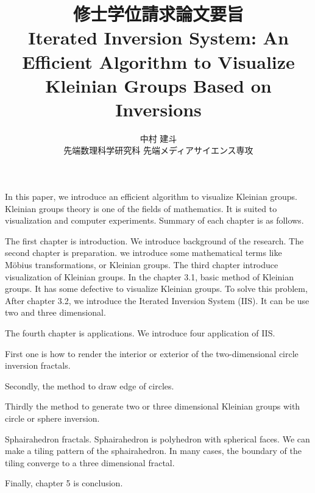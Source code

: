 \documentclass[uplatex, dvipdfmx]{article}
\title{修士学位請求論文要旨\\
 Iterated Inversion System: An Efficient Algorithm to Visualize Kleinian Groups Based on Inversions }
\author{中村 建斗\\
先端数理科学研究科 先端メディアサイエンス専攻\\
}
\date{}
\begin{document}
\maketitle
\pagestyle{plain}
\newpage

In this paper, we introduce an efficient algorithm to visualize Kleinian
groups.
Kleinian groups theory is one of the fields of mathematics.
It is suited to visualization and computer experiments.
Summary of each chapter is as follows.

The first chapter is introduction. 
We introduce background of the research.
The second chapter is preparation.
we introduce some mathematical terms like M\"obius
transformations, or Kleinian groups.
The third chapter introduce visualization of Kleinian groups.
In the chapter 3.1, basic method of Kleinian groups.
It has some defective to visualize Kleinian groups.
To solve this problem,
After chapter 3.2, we introduce the Iterated Inversion System (IIS).
It can be use two and three dimensional.

The fourth chapter is applications.
We introduce four application of IIS.

First one is how to render the interior or exterior of the
two-dimensional circle inversion fractals.

Secondly, the method to draw edge of circles.

Thirdly
the method to generate two or three dimensional Kleinian groups with
circle or sphere inversion.

Sphairahedron fractals. Sphairahedron is polyhedron with spherical
faces. We can make a tiling pattern of the sphairahedron.
In many cases, the boundary of the tiling converge to a three
dimensional fractal. 


Finally, chapter 5 is conclusion.
\end{document}
